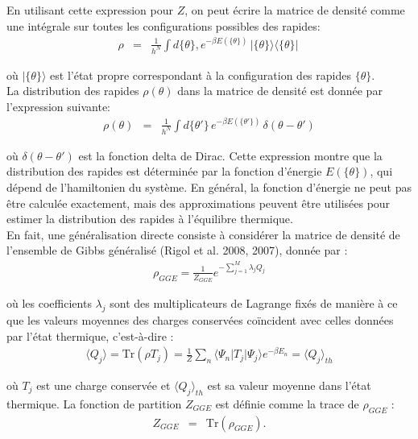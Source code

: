 	En utilisant cette expression pour $Z$, on peut écrire la matrice de densité comme une intégrale sur toutes les configurations possibles des rapides:
	\begin{eqnarray}
		\rho &= & \frac{1}{h^N} \int d\{\theta\} , e^{-\beta E(\{\theta\})} \, |\{\theta\}\rangle\langle\{\theta\}| \	
	\end{eqnarray}
	
	où $|\{\theta\}\rangle$ est l'état propre correspondant à la configuration des rapides $\{\theta\}$.\\
	
	La distribution des rapides $\rho(\theta)$ dans la matrice de densité est donnée par l'expression suivante:
	\begin{eqnarray}
		\rho(\theta) &= & \frac{1}{h^N} \int d\{\theta'\} \, e^{-\beta E(\{\theta'\})} \, \delta(\theta - \theta')	
	\end{eqnarray}
	
	où $\delta(\theta-\theta')$ est la fonction delta de Dirac. Cette expression montre que la distribution des rapides est déterminée par la fonction d'énergie $E(\{\theta\})$, qui dépend de l'hamiltonien du système. En général, la fonction d'énergie ne peut pas être calculée exactement, mais des approximations peuvent être utilisées pour estimer la distribution des rapides à l'équilibre thermique.\\
	
	En fait, une généralisation directe consiste à considérer la matrice de densité de l'ensemble de Gibbs généralisé (Rigol et al. 2008, 2007), donnée par :
	\begin{eqnarray}
		\rho_{GGE} = \frac{1}{Z_{GGE}} e^{-\sum_{j=1}^M \lambda_j Q_j  }	
	\end{eqnarray}

	
	où les coefficients $\lambda_j$ sont des multiplicateurs de Lagrange fixés de manière à ce que les valeurs moyennes des charges conservées coïncident avec celles données par l'état thermique, c'est-à-dire :
	\begin{eqnarray}
		\langle Q_j \rangle = \text{Tr} ( \rho T_j ) = \frac{1}{Z} \sum_n \langle \Psi_n \vert T_j \vert \Psi_j \rangle e^{- \beta E_n }  = \langle Q_j \rangle_{th}	
	\end{eqnarray}

	
	où $T_j$ est une charge conservée et $\langle Q_j \rangle_{th}$ est sa valeur moyenne dans l'état thermique. La fonction de partition $Z_{GGE}$ est définie comme la trace de $\rho_{GGE}$ :
	\begin{eqnarray}
		Z_{GGE} & = & 	\text{Tr} ( \rho_{GGE} ) .
	\end{eqnarray}

